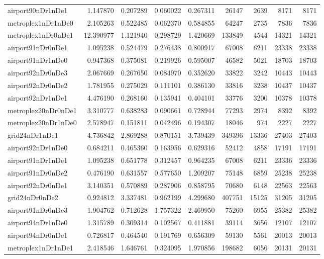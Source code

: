 \documentclass[../../../thesis.tex]{subfiles}
\begin{document}
\begin{longtable}{|l|r|r|r|r|r|r|r|r|}
airport90nDr1nDe1 & 1.147870 & 0.207289 & 0.060022 & 0.267311 & 26147 & 2639 & 8171 & 8171 \\
metroplex1nDr1nDe0 & 2.105263 & 0.522485 & 0.062370 & 0.584855 & 64247 & 2735 & 7836 & 7836 \\
metroplex1nDr0nDe1 & 12.390977 & 1.121940 & 0.298729 & 1.420669 & 133849 & 4544 & 14321 & 14321 \\
airport91nDr0nDe1 & 1.095238 & 0.524479 & 0.276438 & 0.800917 & 67008 & 6211 & 23338 & 23338 \\
airport91nDr1nDe0 & 0.947368 & 0.375081 & 0.219926 & 0.595007 & 46582 & 5021 & 18703 & 18703 \\
airport92nDr0nDe3 & 2.067669 & 0.267650 & 0.084970 & 0.352620 & 33822 & 3242 & 10443 & 10443 \\
airport92nDr0nDe2 & 1.781955 & 0.275029 & 0.111101 & 0.386130 & 33816 & 3238 & 10437 & 10437 \\
airport92nDr1nDe1 & 4.476190 & 0.268160 & 0.135941 & 0.404101 & 33776 & 3200 & 10378 & 10378 \\
metroplex20nDr0nDe1 & 3.310777 & 0.638283 & 0.090661 & 0.728944 & 77293 & 2974 & 8392 & 8392 \\
metroplex20nDr1nDe0 & 2.578947 & 0.151811 & 0.042496 & 0.194307 & 18046 & 974 & 2227 & 2227 \\
grid24nDr1nDe1 & 4.736842 & 2.869288 & 0.870151 & 3.739439 & 349396 & 13336 & 27403 & 27403 \\
airport92nDr1nDe0 & 0.684211 & 0.465360 & 0.163956 & 0.629316 & 52412 & 4858 & 17191 & 17191 \\
airport91nDr1nDe1 & 1.095238 & 0.651778 & 0.312457 & 0.964235 & 67008 & 6211 & 23336 & 23336 \\
airport91nDr0nDe2 & 0.476190 & 0.631557 & 0.577650 & 1.209207 & 75148 & 6859 & 25238 & 25238 \\
airport92nDr0nDe1 & 3.140351 & 0.570889 & 0.287906 & 0.858795 & 70680 & 6148 & 22563 & 22563 \\
grid24nDr0nDe2 & 0.924812 & 3.337481 & 0.962199 & 4.299680 & 407751 & 15125 & 31205 & 31205 \\
airport91nDr0nDe3 & 1.904762 & 0.712628 & 1.757322 & 2.469950 & 75260 & 6955 & 25382 & 25382 \\
airport94nDr1nDe0 & 1.315789 & 0.309314 & 0.102567 & 0.411881 & 39114 & 3656 & 12107 & 12107 \\
airport94nDr0nDe1 & 0.726817 & 0.464540 & 0.191769 & 0.656309 & 59130 & 5561 & 20013 & 20013 \\
metroplex1nDr1nDe1 & 2.418546 & 1.646761 & 0.324095 & 1.970856 & 198682 & 6056 & 20131 & 20131 \\

\end{longtable}
\end{document}
